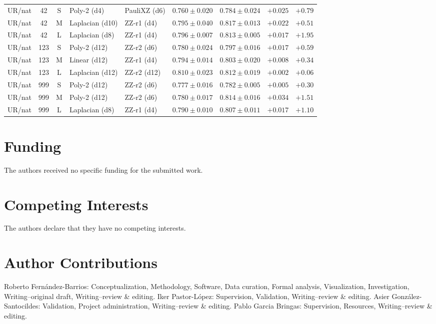 \documentclass[journal]{IEEEtran}
\begin{document}
\begin{table}[!t]
\begin{tabular}{@{}ccc ll cc rr@{}}
UR/nat & 42 & S & Poly-2 (d4) & PauliXZ (d6) & $0.760\pm0.020$ & $0.784\pm0.024$ & $+0.025$ & $+0.79$ \\
UR/nat & 42 & M & Laplacian (d10) & ZZ-r1 (d4) & $0.795\pm0.040$ & $0.817\pm0.013$ & $+0.022$ & $+0.51$ \\
UR/nat & 42 & L & Laplacian (d8) & ZZ-r1 (d4) & $0.796\pm0.007$ & $0.813\pm0.005$ & $+0.017$ & $+1.95$ \\
UR/nat & 123 & S & Poly-2 (d12) & ZZ-r2 (d6) & $0.780\pm0.024$ & $0.797\pm0.016$ & $+0.017$ & $+0.59$ \\
UR/nat & 123 & M & Linear (d12) & ZZ-r1 (d4) & $0.794\pm0.014$ & $0.803\pm0.020$ & $+0.008$ & $+0.34$ \\
UR/nat & 123 & L & Laplacian (d12) & ZZ-r2 (d12) & $0.810\pm0.023$ & $0.812\pm0.019$ & $+0.002$ & $+0.06$ \\
UR/nat & 999 & S & Poly-2 (d12) & ZZ-r2 (d6) & $0.777\pm0.016$ & $0.782\pm0.005$ & $+0.005$ & $+0.30$ \\
UR/nat & 999 & M & Poly-2 (d12) & ZZ-r2 (d6) & $0.780\pm0.017$ & $0.814\pm0.016$ & $+0.034$ & $+1.51$ \\
UR/nat & 999 & L & Laplacian (d8) & ZZ-r1 (d4) & $0.790\pm0.010$ & $0.807\pm0.011$ & $+0.017$ & $+1.10$ \\\bottomrule
\end{tabular}
\end{table}



\section*{Funding}
The authors received no specific funding for the submitted work.

\section*{Competing Interests}
The authors declare that they have no competing interests.

\section*{Author Contributions}
Roberto Fernández-Barrios: Conceptualization, Methodology, Software, Data curation, Formal analysis, Visualization, Investigation, Writing--original draft, Writing--review \& editing.
Iker Pastor-López: Supervision, Validation, Writing--review \& editing.
Asier González-Santocildes: Validation, Project administration, Writing--review \& editing.
Pablo Garcia Bringas: Supervision, Resources, Writing--review \& editing.
\end{document}
